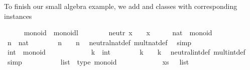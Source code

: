 \begin{isabellebody}
{\isafoldproof}%
%
\isadelimproof
%
\endisadelimproof
%
\begin{isamarkuptext}%
To finish our small algebra example, we add 
  and  classes with corresponding instances%
\end{isamarkuptext}%
\isamarkuptrue%
\ \ \ \ \isamarkupfalse%
\ monoid\ {\isacharequal}\ monoidl\ {\isacharplus}\isanewline
\ \ \ \ \ \ \ neutr{\isacharcolon}\ {\isachardoublequoteopen}x\ \isactrlloc {\isasymotimes}\ \isactrlloc {\isasymone}\ {\isacharequal}\ x{\isachardoublequoteclose}\isanewline
\isanewline
\ \ \ \ \isamarkupfalse%
\ nat\ {\isacharcolon}{\isacharcolon}\ monoid\isanewline
%
\isadelimproof
\ \ \ \ %
\endisadelimproof
%
\isatagproof
{}\isamarkupfalse%
\isanewline
\ \ \ \ \ \ \isamarkupfalse%
\ n\ {\isacharcolon}{\isacharcolon}\ nat\isanewline
\ \ \ \ \ \ \isamarkupfalse%
\ {\isachardoublequoteopen}n\ {\isasymotimes}\ {\isasymone}\ {\isacharequal}\ n{\isachardoublequoteclose}\ \isamarkupfalse%
\ neutral{\isacharunderscore}nat{\isacharunderscore}def\ mult{\isacharunderscore}nat{\isacharunderscore}def\ \isamarkupfalse%
\ simp\isanewline
\ \ \ \ \isamarkupfalse%
%
\endisatagproof
{\isafoldproof}%
%
\isadelimproof
\isanewline
%
\endisadelimproof
\isanewline
\ \ \ \ \isamarkupfalse%
\ int\ {\isacharcolon}{\isacharcolon}\ monoid\isanewline
%
\isadelimproof
\ \ \ \ %
\endisadelimproof
%
\isatagproof
{}\isamarkupfalse%
\isanewline
\ \ \ \ \ \ \isamarkupfalse%
\ k\ {\isacharcolon}{\isacharcolon}\ int\isanewline
\ \ \ \ \ \ \isamarkupfalse%
\ {\isachardoublequoteopen}k\ {\isasymotimes}\ {\isasymone}\ {\isacharequal}\ k{\isachardoublequoteclose}\ \isamarkupfalse%
\ neutral{\isacharunderscore}int{\isacharunderscore}def\ mult{\isacharunderscore}int{\isacharunderscore}def\ \isamarkupfalse%
\ simp\isanewline
\ \ \ \ \isamarkupfalse%
%
\endisatagproof
{\isafoldproof}%
%
\isadelimproof
\isanewline
%
\endisadelimproof
\isanewline
\ \ \ \ \isamarkupfalse%
\ list\ {\isacharcolon}{\isacharcolon}\ {\isacharparenleft}type{\isacharparenright}\ monoid\isanewline
%
\isadelimproof
\ \ \ \ %
\endisadelimproof
%
\isatagproof
{}\isamarkupfalse%
\isanewline
\ \ \ \ \ \ \isamarkupfalse%
\ xs\ {\isacharcolon}{\isacharcolon}\ {\isachardoublequoteopen}{\isasymalpha}\ list{\isachardoublequoteclose}\isanewline

\end{isabellebody}
